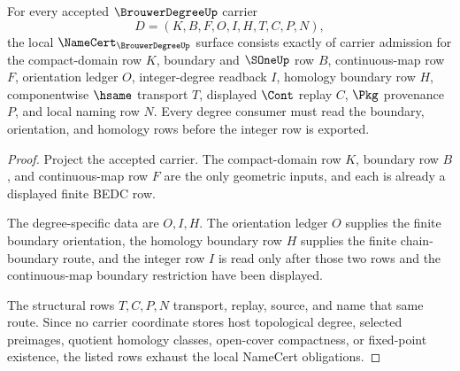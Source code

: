 \begin{theorem}
\label{thm:brouwer-degree-namecert-obligations}
For every accepted $\BrouwerDegreeUp$ carrier
$$
D=(K,B,F,O,I,H,T,C,P,N),
$$
the local $\NameCert_{\BrouwerDegreeUp}$ surface consists exactly of carrier admission for the compact-domain row $K$, boundary and $\SOneUp$ row $B$, continuous-map row $F$, orientation ledger $O$, integer-degree readback $I$, homology boundary row $H$, componentwise $\hsame$ transport $T$, displayed $\Cont$ replay $C$, $\Pkg$ provenance $P$, and local naming row $N$. Every degree consumer must read the boundary, orientation, and homology rows before the integer row is exported.
\end{theorem}
\begin{proof}
Project the accepted carrier. The compact-domain row $K$, boundary row $B$, and continuous-map row $F$ are the only geometric inputs, and each is already a displayed finite BEDC row.

The degree-specific data are $O,I,H$. The orientation ledger $O$ supplies the finite boundary orientation, the homology boundary row $H$ supplies the finite chain-boundary route, and the integer row $I$ is read only after those two rows and the continuous-map boundary restriction have been displayed.

The structural rows $T,C,P,N$ transport, replay, source, and name that same route. Since no carrier coordinate stores host topological degree, selected preimages, quotient homology classes, open-cover compactness, or fixed-point existence, the listed rows exhaust the local NameCert obligations.
\end{proof}

